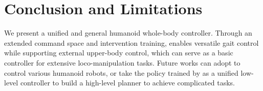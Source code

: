 \section{Conclusion and Limitations} 
\label{sec:conclusion} 
We present a unified and general humanoid whole-body controller. Through an extended command space and intervention training, \our enables versatile gait control while supporting external upper-body control, which can serve as a basic controller for extensive loco-manipulation tasks. Future works can adopt \our to control various humanoid robots, or take the policy trained by \our as a unified low-level controller to build a high-level planner to achieve complicated tasks.